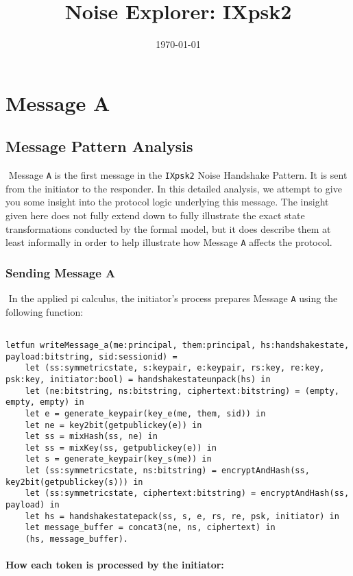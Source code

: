 \title{Noise Explorer: IXpsk2}\date{\today}\maketitle\section{ Message A}

\subsection{Message Pattern Analysis}$ $
Message \texttt{A} is the first message in the \texttt{IXpsk2} Noise Handshake Pattern. It is sent from the initiator to the responder. In this detailed analysis, we attempt to give you some insight into the protocol logic underlying this message. The insight given here does not fully extend down to fully illustrate the exact state transformations conducted by the formal model, but it does describe them at least informally in order to help illustrate how Message \texttt{A} affects the protocol.


\subsubsection{Sending Message A}$ $
In the applied pi calculus, the initiator's process prepares Message \texttt{A} using the following function:


\begin{lstlisting}

letfun writeMessage_a(me:principal, them:principal, hs:handshakestate, payload:bitstring, sid:sessionid) =
	let (ss:symmetricstate, s:keypair, e:keypair, rs:key, re:key, psk:key, initiator:bool) = handshakestateunpack(hs) in
	let (ne:bitstring, ns:bitstring, ciphertext:bitstring) = (empty, empty, empty) in
	let e = generate_keypair(key_e(me, them, sid)) in
	let ne = key2bit(getpublickey(e)) in
	let ss = mixHash(ss, ne) in
	let ss = mixKey(ss, getpublickey(e)) in
	let s = generate_keypair(key_s(me)) in
	let (ss:symmetricstate, ns:bitstring) = encryptAndHash(ss, key2bit(getpublickey(s))) in
	let (ss:symmetricstate, ciphertext:bitstring) = encryptAndHash(ss, payload) in
	let hs = handshakestatepack(ss, s, e, rs, re, psk, initiator) in
	let message_buffer = concat3(ne, ns, ciphertext) in
	(hs, message_buffer).

\end{lstlisting}

\paragraph{How each token is processed by the initiator:}$ $

